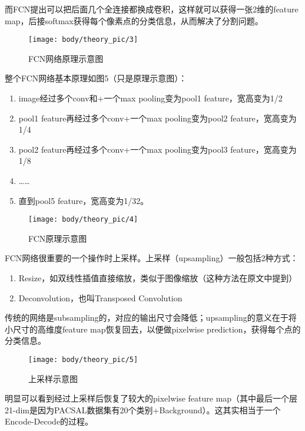而FCN提出可以把后面几个全连接都换成卷积，这样就可以获得一张2维的feature
map，后接softmax获得每个像素点的分类信息，从而解决了分割问题。

\begin{figure}[htbp]
\centering
\texttt{[image: body/theory\_pic/3]}
\caption{FCN网络原理示意图}
\label{fig::theory3}
\end{figure}

整个FCN网络基本原理如图5（只是原理示意图）：

\begin{enumerate}
\def\labelenumi{\arabic{enumi}.}
\tightlist
\item
  image经过多个conv和+一个max pooling变为pool1 feature，宽高变为1/2
\item
  pool1 feature再经过多个conv+一个max pooling变为pool2
  feature，宽高变为1/4
\item
  pool2 feature再经过多个conv+一个max pooling变为pool3
  feature，宽高变为1/8
\item
  \ldots{}\ldots{}
\item
  直到pool5 feature，宽高变为1/32。
\end{enumerate}

\begin{figure}[htbp]
\centering
\texttt{[image: body/theory\_pic/4]}
\caption{FCN原理示意图}
\label{fig::theory4}
\end{figure}

FCN网络很重要的一个操作时上采样。上采样（upsampling）一般包括2种方式：

\begin{enumerate}
\def\labelenumi{\arabic{enumi}.}
\tightlist
\item
  Resize，如双线性插值直接缩放，类似于图像缩放（这种方法在原文中提到）
\item
  Deconvolution，也叫Transposed Convolution
\end{enumerate}

传统的网络是subsampling的，对应的输出尺寸会降低；upsampling的意义在于将小尺寸的高维度feature
map恢复回去，以便做pixelwise prediction，获得每个点的分类信息。

\begin{figure}[htbp]
\centering
\texttt{[image: body/theory\_pic/5]}
\caption{上采样示意图}
\label{fig::theory5}
\end{figure}

明显可以看到经过上采样后恢复了较大的pixelwise feature
map（其中最后一个层21-dim是因为PACSAL数据集有20个类别+Background）。这其实相当于一个Encode-Decode的过程。

